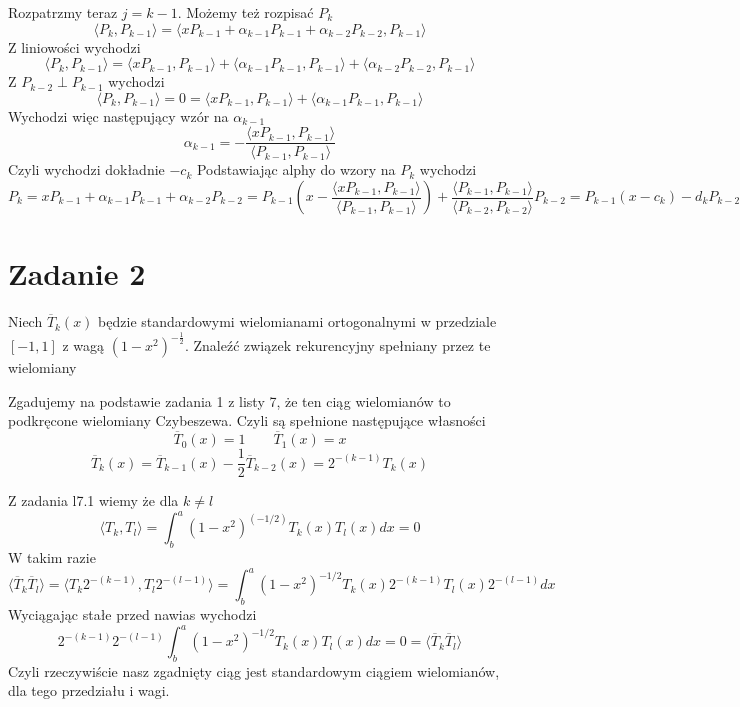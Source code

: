 \documentclass{article}
\begin{document}
Rozpatrzmy teraz $j = k-1$. Możemy też rozpisać $P_k$
\[
    \langle P_k , P_{k-1} \rangle =   \langle x P_{k-1} + \alpha_{k-1} P_{k-1} + \alpha_{k-2} P_{k-2}, P_{k-1} \rangle 
\]
Z liniowości wychodzi
\[
    \langle P_k , P_{k-1} \rangle =   \langle x P_{k-1} , P_{k-1} \rangle +
    \langle \alpha_{k-1} P_{k-1},  P_{k-1}  \rangle +
    \langle \alpha_{k-2} P_{k-2} ,  P_{k-1} \rangle
\]
Z $P_{k-2} \perp P_{k-1}$ wychodzi
\[
    \langle P_k , P_{k-1} \rangle = 0 =   \langle x P_{k-1} , P_{k-1} \rangle +
    \langle \alpha_{k-1} P_{k-1},  P_{k-1}  \rangle 
\]
Wychodzi więc następujący wzór na $\alpha_{k-1}$
\[
    \alpha_{k-1} = - \frac{\langle x P_{k-1} , P_{k-1} \rangle}{\langle P_{k-1},  P_{k-1}  \rangle }
\]
Czyli wychodzi dokładnie $-c_k$ Podstawiając alphy do wzory na $P_k$ wychodzi
\[ 
    P_k = x P_{k-1} + \alpha_{k-1} P_{k-1} + \alpha_{k-2} P_{k-2} =
    P_{k-1} (x -
    \frac{\langle x P_{k-1} , P_{k-1} \rangle}{\langle P_{k-1},  P_{k-1}  \rangle })  + \frac{\langle  P_{k-1},  P_{k-1}  \rangle}{\langle  P_{k-2} , P_{k-2} \rangle } P_{k-2} = P_{k-1} (x - c_k) - d_k P_{k-2}
\]
\section*{Zadanie 2}
Niech $\overline{T}_k(x) $ będzie standardowymi wielomianami ortogonalnymi w przedziale $[-1, 1]$ z wagą $(1-x^2)^{-\frac{1}{2}}$. Znaleźć związek rekurencyjny spełniany przez te wielomiany

Zgadujemy na podstawie zadania 1 z listy 7, że ten ciąg wielomianów to podkręcone wielomiany Czybeszewa. Czyli są spełnione następujące własności
\[ \overline{T}_0(x) = 1 \qquad \overline{T}_1(x) = x \]
\[ \overline{T}_k(x) = \overline{T}_{k-1}(x) - \frac{1}{2} \overline{T}_{k-2}(x)  = 2^{-(k-1)} T_k(x)\]

Z zadania l7.1 wiemy że dla $k \neq l$
\[
  \langle T_k , T_l \rangle = \int^a_b (1-x^2)^(-1/2) T_k(x) T_l(x) dx= 0
\]
W takim razie
\[
    \langle \overline{T}_k \overline{T}_l \rangle = \langle T_k 2^{-(k-1)}, T_l 2^{-(l-1)}\rangle =
    \int^a_b (1-x^2)^{-1/2} T_k(x) 2^{-(k-1)} T_l(x) 2^{-(l-1)} dx
\]
Wyciągając stałe przed nawias wychodzi
\[
    2^{-(k-1)} 2^{-(l-1)} \int^a_b (1-x^2)^{-1/2} T_k(x)  T_l(x)  dx = 0 = \langle \overline{T}_k \overline{T}_l \rangle
\]
Czyli rzeczywiście nasz zgadnięty ciąg jest standardowym ciągiem wielomianów, dla tego przedziału i wagi.
\end{document}
